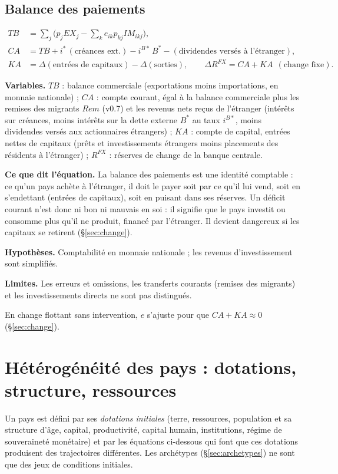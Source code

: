 \documentclass[11pt,a4paper]{article}
\newcommand{\variables}{\par\noindent\textbf{Variables.} }
\newcommand{\sens}{\par\noindent\textbf{Ce que dit l'équation.} }
\newcommand{\hyp}{\par\noindent\textbf{Hypothèses.} }
\newcommand{\limites}{\par\noindent\textbf{Limites.} }
\begin{document}
\subsection{Balance des paiements}
\label{sec:bop}
\begin{align}
TB &= \sum_j \big(p_j EX_j - \textstyle\sum_k e_{ik} p_{kj} IM_{ikj}\big),\\
CA &= TB + i^\ast\,(\text{créances ext.}) - i^{B\ast}\, B^\ast - (\text{dividendes versés à l'étranger}),\\
KA &= \Delta(\text{entrées de capitaux}) - \Delta(\text{sorties}),\qquad \Delta R^{FX} = CA + KA \ \ (\text{change fixe}) .
\end{align}
\begin{lecture}
\variables $TB$ : balance commerciale (exportations moins importations, en monnaie nationale) ; $CA$ : compte courant, égal à la balance commerciale plus les remises des migrants $Rem$ (v0.7) et les revenus nets reçus de l'étranger (intérêts sur créances, moins intérêts sur la dette externe $B^\ast$ au taux $i^{B\ast}$, moins dividendes versés aux actionnaires étrangers) ; $KA$ : compte de capital, entrées nettes de capitaux (prêts et investissements étrangers moins placements des résidents à l'étranger) ; $R^{FX}$ : réserves de change de la banque centrale.
\sens La balance des paiements est une identité comptable : ce qu'un pays achète à l'étranger, il doit le payer soit par ce qu'il lui vend, soit en s'endettant (entrées de capitaux), soit en puisant dans ses réserves. Un déficit courant n'est donc ni bon ni mauvais en soi : il signifie que le pays investit ou consomme plus qu'il ne produit, financé par l'étranger. Il devient dangereux si les capitaux se retirent (\S\ref{sec:change}).
\hyp Comptabilité en monnaie nationale ; les revenus d'investissement sont simplifiés.
\limites Les erreurs et omissions, les transferts courants (remises des migrants) et les investissements directs ne sont pas distingués.
\end{lecture}
En change flottant sans intervention, $e$ s'ajuste pour que $CA + KA \approx 0$ (\S\ref{sec:change}).


\section{Hétérogénéité des pays : dotations, structure, ressources}
\label{sec:hetero}
Un pays est défini par ses \emph{dotations initiales} (terre, ressources, population et sa structure d'âge, capital, productivité, capital humain, institutions, régime de souveraineté monétaire) et par les équations ci-dessous qui font que ces dotations produisent des trajectoires différentes. Les archétypes (\S\ref{sec:archetypes}) ne sont que des jeux de conditions initiales.
\end{document}
